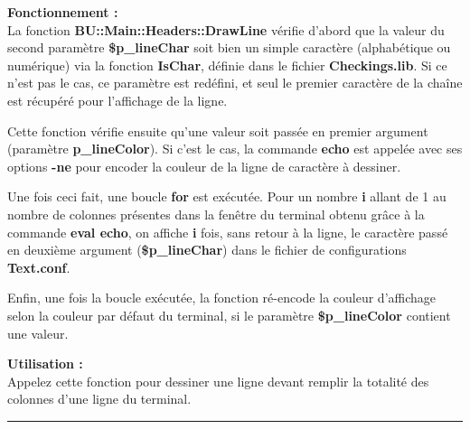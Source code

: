 \documentclass[a4paper,10pt]{article}
\begin{document}
\begin{justify}
    \textbf{Fonctionnement :}\\
    La fonction \textbf{\color{mauve}BU::Main::Headers::DrawLine} vérifie d'abord que la valeur du second paramètre \textbf{\color{orange}\$p\_lineChar} soit bien un simple caractère (alphabétique ou numérique) via la fonction \textbf{\color{mauve}IsChar}, définie dans le fichier \textbf{\color{lime}Checkings.lib}. Si ce n'est pas le cas, ce paramètre est redéfini, et seul le premier caractère de la chaîne est récupéré pour l'affichage de la ligne.
\end{justify}

\begin{justify}
    Cette fonction vérifie ensuite qu'une valeur soit passée en premier argument (paramètre \textbf{\color{orange}p\_lineColor}). Si c'est le cas, la commande \textbf{\color{gray}echo} est appelée avec ses options \textbf{\color{gray}-ne} pour encoder la couleur de la ligne de caractère à dessiner.
\end{justify}

\begin{justify}
    Une fois ceci fait, une boucle \textbf{for} est exécutée. Pour un nombre \textbf{i} allant de 1 au nombre de colonnes présentes dans la fenêtre du terminal obtenu grâce à la commande \textbf{\color{gray}eval echo}, on affiche \textbf{i} fois, sans retour à la ligne, le caractère passé en deuxième argument (\textbf{\color{orange}\$p\_lineChar}) dans le fichier de
configurations \textbf{\color{lime}Text.conf}.
\end{justify}

\begin{justify}
    Enfin, une fois la boucle exécutée, la fonction ré-encode la couleur d'affichage selon la couleur par défaut du terminal, si le paramètre \textbf{\color{orange}\$p\_lineColor} contient une valeur.
\end{justify}

\begin{justify}
    \textbf{Utilisation :}\\
    Appelez cette fonction pour dessiner une ligne devant remplir la totalité des colonnes d'une ligne du terminal.\\
\end{justify}



\color{blue}\par\noindent\rule{\textwidth}{0.4pt}\color{white}\\[1\baselineskip]
\end{document}
